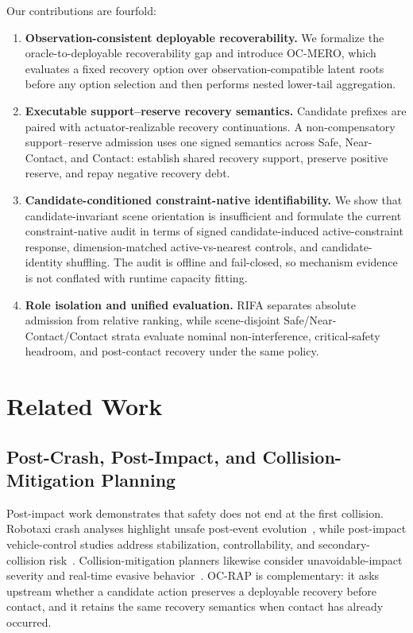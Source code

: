 \documentclass[conference]{IEEEtran}
\begin{document}
Our contributions are fourfold:
\begin{enumerate}[leftmargin=*]
    \item \textbf{Observation-consistent deployable recoverability.} We formalize the oracle-to-deployable recoverability gap and introduce OC-MERO, which evaluates a fixed recovery option over observation-compatible latent roots before any option selection and then performs nested lower-tail aggregation.
    \item \textbf{Executable support--reserve recovery semantics.} Candidate prefixes are paired with actuator-realizable recovery continuations. A non-compensatory support--reserve admission uses one signed semantics across Safe, Near-Contact, and Contact: establish shared recovery support, preserve positive reserve, and repay negative recovery debt.
    \item \textbf{Candidate-conditioned constraint-native identifiability.} We show that candidate-invariant scene orientation is insufficient and formulate the current constraint-native audit in terms of signed candidate-induced active-constraint response, dimension-matched active-vs-nearest controls, and candidate-identity shuffling. The audit is offline and fail-closed, so mechanism evidence is not conflated with runtime capacity fitting.
    \item \textbf{Role isolation and unified evaluation.} RIFA separates absolute admission from relative ranking, while scene-disjoint Safe/Near-Contact/Contact strata evaluate nominal non-interference, critical-safety headroom, and post-contact recovery under the same policy.
\end{enumerate}

\section{Related Work}

\subsection{Post-Crash, Post-Impact, and Collision-Mitigation Planning}
Post-impact work demonstrates that safety does not end at the first collision. Robotaxi crash analyses highlight unsafe post-event evolution~\cite{koopman2024anatomy}, while post-impact vehicle-control studies address stabilization, controllability, and secondary-collision risk~\cite{wang2023integrated,parseh2023motion,wang2024post,yang2025post,ghosh2026post}. Collision-mitigation planners likewise consider unavoidable-impact severity and real-time evasive behavior~\cite{li2022vehicle,bosia2024real}. OC-RAP is complementary: it asks upstream whether a candidate action preserves a deployable recovery before contact, and it retains the same recovery semantics when contact has already occurred.
\end{document}
